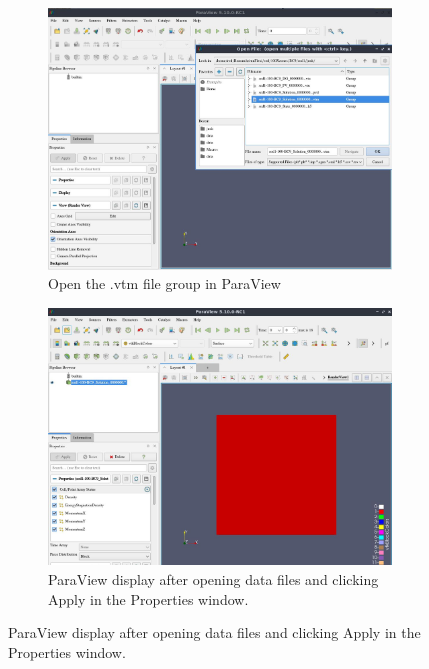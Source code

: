\begin{appendices}
\begin{figure}
\centering
\begin{subfigure}{.95\textwidth}
  \centering
  \includegraphics[width=.9\linewidth,height=0.9\linewidth,scale=1]{figures/paraviewGrabs/OpenFiles.jpg}
  \caption{Open the .vtm file group in ParaView}
  \label{fig:openPV}
\end{subfigure}
\begin{subfigure}{.95\textwidth}
  \centering
  \includegraphics[width=.9\linewidth,height=0.9\linewidth,scale=1]{figures/paraviewGrabs/AfterApply-openfile.jpg}
  \caption{ParaView display after opening data files and clicking Apply in the Properties window.}
  \label{fig:applyPV}
\end{subfigure}
\end{figure}


\end{appendices}
